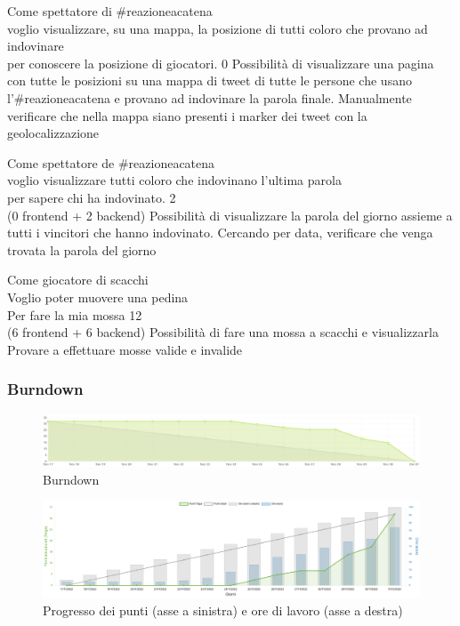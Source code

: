 \userstory%
{Come spettatore di \#reazioneacatena\\voglio visualizzare, su una mappa, la posizione di tutti coloro che provano ad indovinare\\per conoscere la posizione di giocatori.}%
{0}%
{Possibilità di visualizzare una pagina con tutte le posizioni su una mappa di tweet di tutte le persone che usano l'\#reazioneacatena e provano ad indovinare la parola finale.}%
{Manualmente verificare che nella mappa siano presenti i marker dei tweet con la geolocalizzazione}

\userstory%
{Come spettatore de \#reazioneacatena\\voglio visualizzare tutti coloro che indovinano l'ultima parola\\per sapere chi ha indovinato.}%
{2\\(0 frontend + 2 backend)}%
{Possibilità di visualizzare la parola del giorno assieme a tutti i vincitori che hanno indovinato.}%
{Cercando per data, verificare che venga trovata la parola del giorno}

\userstory%
{Come giocatore di scacchi\\Voglio poter muovere una pedina\\Per fare la mia mossa}%
{12\\(6 frontend + 6 backend)}%
{Possibilità di fare una mossa a scacchi e visualizzarla}%
{Provare a effettuare mosse valide e invalide}

\subsubsection{Burndown}
\begin{figure}[H]
    \centering
    \includegraphics[width=15cm]{./img/sprint3/burndown.png}
    \caption{Burndown}
\end{figure}
\begin{figure}[H]
    \centering
    \includegraphics[width=15cm]{./img/sprint3/worktime.png}
    \caption{Progresso dei punti (asse a sinistra) e ore di lavoro (asse a destra)}
\end{figure}

